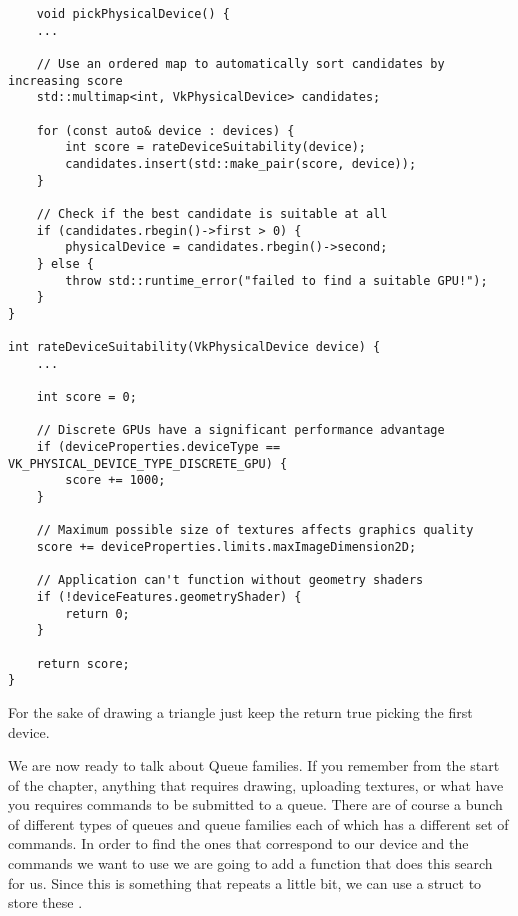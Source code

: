 \begin{center}
\begin{minipage}{0.95\linewidth}
\begin{lstlisting}
    void pickPhysicalDevice() {
    ...

    // Use an ordered map to automatically sort candidates by increasing score
    std::multimap<int, VkPhysicalDevice> candidates;

    for (const auto& device : devices) {
        int score = rateDeviceSuitability(device);
        candidates.insert(std::make_pair(score, device));
    }

    // Check if the best candidate is suitable at all
    if (candidates.rbegin()->first > 0) {
        physicalDevice = candidates.rbegin()->second;
    } else {
        throw std::runtime_error("failed to find a suitable GPU!");
    }
}

int rateDeviceSuitability(VkPhysicalDevice device) {
    ...

    int score = 0;

    // Discrete GPUs have a significant performance advantage
    if (deviceProperties.deviceType == VK_PHYSICAL_DEVICE_TYPE_DISCRETE_GPU) {
        score += 1000;
    }

    // Maximum possible size of textures affects graphics quality
    score += deviceProperties.limits.maxImageDimension2D;

    // Application can't function without geometry shaders
    if (!deviceFeatures.geometryShader) {
        return 0;
    }

    return score;
}
\end{lstlisting}
\end{minipage}
\end{center}

\par For the sake of drawing a triangle just keep the return true picking the first device.

\par We are now ready to talk about Queue families. If you remember from the start of the chapter, anything that requires drawing, uploading textures, or what have you requires commands to be submitted to a queue. There are of course a bunch of different types of queues and queue families each of which has a different set of commands. In order to find the ones that correspond to our device and the commands we want to use we are going to add a  function that does this search for us.
Since this is something that repeats a little bit, we can use a struct to store these .

